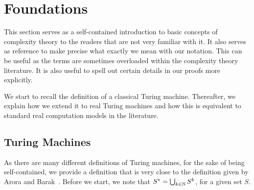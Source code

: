 \documentclass{article}
\begin{document}



\appendix

\section{Foundations}
\label{sec:preliminaries}
This section serves as a self-contained introduction to basic concepts of complexity theory
to the readers that are not very familiar with it.
It also serves as reference to make precise what exactly we mean with our notation.
This can be useful as the terms are sometimes overloaded within the complexity theory literature.
It is also useful to spell out certain details in our proofs more explicitly.

We start to recall the definition of a classical Turing machine.
Thereafter, we explain how we extend it to real Turing machines 
and how this is equivalent to standard real computation models in the literature.


\subsection{Turing Machines}
\label{sec:TuringMachines}
As there are many different definitions of Turing machines, for the sake of being self-contained, 
we provide a definition that is very close to the definition given by Arora and Barak~\cite{AB09}.
Before we start, we note that $S^* = \bigcup_{k\in \mathbb{N}} S^k$, for a given set $S$.
\end{document}
